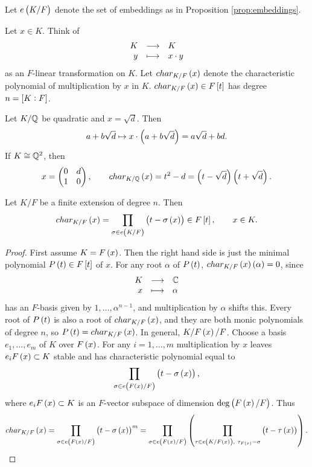 \begin{notation*}
Let $ e\br{K / F} $ denote the set of embeddings as in Proposition \ref{prop:embeddings}.
\end{notation*}

Let $ x \in K $. Think of
$$ \function{K}{K}{y}{x \cdot y} $$
as an $ F $-linear transformation on $ K $. Let $ char_{K / F}\br{x} $ denote the characteristic polynomial of multiplication by $ x $ in $ K $. $ char_{K / F}\br{x} \in F\sbr{t} $ has degree $ n = \sbr{K : F} $.

\begin{example*}
Let $ K / \mathbb{Q} $ be quadratic and $ x = \sqrt{d} $. Then
$$ a + b\sqrt{d} \mapsto x \cdot \br{a + b\sqrt{d}} = a\sqrt{d} + bd. $$
If $ K \cong \mathbb{Q}^2 $, then
$$ x = \twobytwo{0}{d}{1}{0}, \qquad char_{K / \Q}\br{x} = t^2 - d = \br{t - \sqrt{d}}\br{t + \sqrt{d}}. $$
\end{example*}

\begin{proposition}
Let $ K / F $ be a finite extension of degree $ n $. Then
$$ char_{K / F}\br{x} = \prod_{\sigma \in e\br{K / F}} \br{t - \sigma\br{x}} \in F\sbr{t}, \qquad x \in K. $$
\end{proposition}

\pagebreak

\begin{proof}
First assume $ K = F\br{x} $. Then the right hand side is just the minimal polynomial $ P\br{t} \in F\sbr{t} $ of $ x $. For any root $ \alpha $ of $ P\br{t} $, $ char_{K / F}\br{x}\br{\alpha} = 0 $, since
$$ \function{K}{\C}{x}{\alpha} $$
has an $ F $-basis given by $ 1, \dots, \alpha^{n - 1} $, and multiplication by $ \alpha $ shifts this. Every root of $ P\br{t} $ is also a root of $ char_{K / F}\br{x} $, and they are both monic polynomials of degree $ n $, so $ P\br{t} = char_{K / F}\br{x} $. In general, $ K / F\br{x} / F $. Choose a basis $ e_1, \dots, e_m $ of $ K $ over $ F\br{x} $. For any $ i = 1, \dots, m $ multiplication by $ x $ leaves $ e_iF\br{x} \subset K $ stable and has characteristic polynomial equal to
$$ \prod_{\sigma \in e\br{F\br{x} / F}} \br{t - \sigma\br{x}}, $$
where $ e_iF\br{x} \subset K $ is an $ F $-vector subspace of dimension $ \deg\br{F\br{x} / F} $. Thus
$$ char_{K / F}\br{x} = \prod_{\sigma \in e\br{F\br{x} / F}} \br{t - \sigma\br{x}}^m = \prod_{\sigma \in e\br{F\br{x} / F}} \br{\prod_{\tau \in e\br{K / F\br{x}}, \ \tau_{F\br{x}} = \sigma} \br{t - \tau\br{x}}}. $$
\end{proof}

